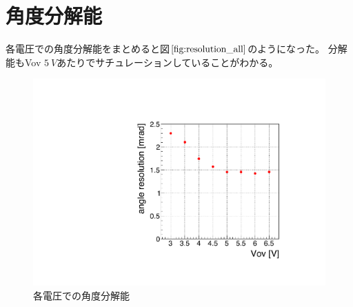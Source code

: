\documentclass[uplatex, titlepage, dvipdfmx, 12pt, a4paper]{jsreport}
\begin{document}
  \section{角度分解能}
    各電圧での角度分解能をまとめると図$\ref{fig:resolution_all}$のようになった。
    分解能もVov $\SI{5}{V}$あたりでサチュレーションしていることがわかる。
    \begin{figure}[htbp]
      \begin{center} 
        \includegraphics[scale=0.4, clip]{image/resolutin_allV.pdf}
        \caption{各電圧での角度分解能} 
        \label{fig:resolution_all} 
      \end{center}
    \end{figure}
\end{document}
